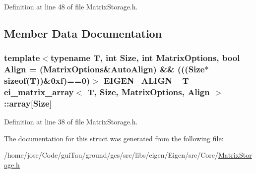 Definition at line 48 of file Matrix\-Storage.\-h.



\subsection{Member Data Documentation}
\hypertarget{structei__matrix__array_abece385328c2e4f6a70bb5e7a57a759c}{
\subsubsection[{array}]{\setlength{\rightskip}{0pt plus 5cm}template$<$typename T, int Size, int Matrix\-Options, bool Align = (\-Matrix\-Options\&\-Auto\-Align) \&\& (((\-Size$\ast$sizeof(\-T))\&0xf)==0)$>$ E\-I\-G\-E\-N\-\_\-\-A\-L\-I\-G\-N\-\_ T {\bf ei\-\_\-matrix\-\_\-array}$<$ T, Size, Matrix\-Options, Align $>$\-::array\mbox{[}Size\mbox{]}}}\label{structei__matrix__array_abece385328c2e4f6a70bb5e7a57a759c}


Definition at line 38 of file Matrix\-Storage.\-h.



The documentation for this struct was generated from the following file\-:\begin{DoxyCompactItemize}
\item 
/home/jose/\-Code/gui\-Tau/ground/gcs/src/libs/eigen/\-Eigen/src/\-Core/\hyperlink{_matrix_storage_8h}{Matrix\-Storage.\-h}\end{DoxyCompactItemize}
